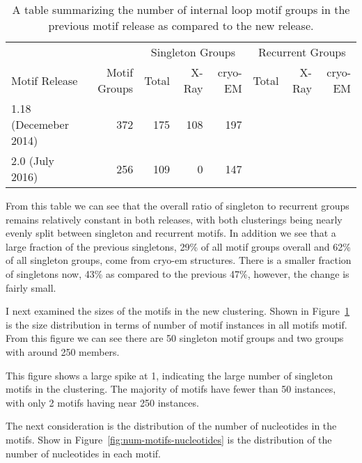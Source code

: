 \begin{table}
  \begin{tabular}{lrrrrrrr}
    \toprule
                  &                                      & \multicolumn{3}{c}{Singleton Groups} & \multicolumn{3}{c}{Recurrent Groups} \\
    Motif Release & 
      Motif Groups & 
      Total & 
      X-Ray &
      cryo-EM & 
      Total & 
      X-Ray &
      cryo-EM \\
    \midrule
    1.18 (Decemeber 2014) & 372 & 175 & 108 & 197 & \\
    2.0 (July 2016)       & 256 & 109 & 0   & 147 & \\
    \bottomrule
  \end{tabular}
  \caption{A table summarizing the number of internal loop motif groups in the
  previous motif release as compared to the new release. }
  \label{tab:loop-counts}
\end{table}

From this table we can see that the overall ratio of singleton to recurrent
groups remains relatively constant in both releases, with both clusterings being
nearly evenly split between singleton and recurrent motifs. In addition we see
that a large fraction of the previous singletons, 29\% of all motif groups
overall and 62\% of all singleton groups, come from cryo-em structures. There is
a smaller fraction of singletons now, 43\% as compared to the previous 47\%,
however, the change is fairly small.

I next examined the sizes of the motifs in the new clustering. Shown in
Figure~\ref{fig:num-motif-instances} is the size distribution in terms of number
of motif instances in all motifs motif. From this figure we can see there are 50
singleton motif groups and two groups with around 250 members.

\begin{figure}
  \caption{}
  \label{fig:num-motif-instances}
\end{figure}

This figure shows a large spike at 1, indicating the large number of singleton
motifs in the clustering. The majority of motifs have fewer than 50 instances,
with only 2 motifs having near 250 instances.

The next consideration is the distribution of the number of nucleotides in the
motifs. Show in Figure~\ref{fig:num-motifs-nucleotides} is the distribution of
the number of nucleotides in each motif.

\begin{figure}
  \caption{}
  \label{fig:num-motif-nucleotides}
\end{figure}

